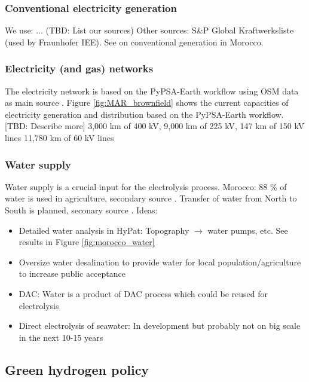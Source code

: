 \subsubsection{Conventional electricity generation}
We use: ... (TBD: List our sources)
Other sources: S\&P Global Kraftwerksliste (used by Fraunhofer IEE).
See \cite[p. 26]{Ersoy2022}  on conventional generation in Morocco.



\subsubsection{Electricity (and gas) networks}
The electricity network is based on the PyPSA-Earth workflow using OSM data as main source \cite{Parzen2022}. Figure \ref{fig:MAR_brownfield} shows the current capacities of electricity generation and distribution based on the PyPSA-Earth workflow. [TBD: Describe more]
3,000 km of 400 kV, 9,000 km of 225 kV, 147 km of 150 kV lines 
11,780 km of 60 kV lines \cite[p. 6, primary 44]{Boulakhbar2020}





\subsubsection{Water supply}
\label{subsec:water_supply}
Water supply is a crucial input for the electrolysis process. 
Morocco: 88 \% of water is used in agriculture, secondary source \cite{Ersoy2022}.
Transfer of water from North to South is planned, seconary source \cite{Ersoy2022}.
Ideas:
\begin{itemize}
    \item Detailed water analysis in HyPat: Topography $\rightarrow$ water pumps, etc. See results in Figure \ref{fig:morocco_water}
    \item Oversize water desalination to provide water for local population/agriculture to increase public acceptance
    \item DAC: Water is a product of DAC process which could be reused for electrolysis
    \item Direct electrolysis of seawater: In development but probably not on big scale in the next 10-15 years
\end{itemize}


\subsection{Green hydrogen policy}
\label{subsubsec:green_hydrogen_constraint}

